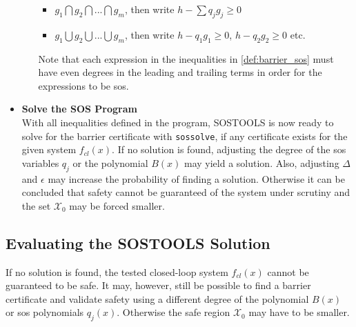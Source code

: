 \begin{itemize}
\begin{itemize}
		\begin{itemize}
			\item $g_1 \bigcap g_2 \bigcap ... \bigcap g_m$, then write $h - \sum q_jg_j\geq 0$
			\item $g_1 \bigcup g_2 \bigcup ... \bigcup g_m$, then write $h - q_1g_1\geq 0$, $h - q_2g_2\geq 0$ etc.
		\end{itemize} 
		Note that each expression in the inequalities in \autoref{def:barrier_sos} must have even degrees in the leading and trailing terms in order for the expressions to be \gls{sos}.
	\end{itemize}
	\item \textbf{Solve the SOS Program}\\
	With all inequalities defined in the program, SOSTOOLS is now ready to solve for the barrier certificate with \texttt{sossolve}, if any certificate exists for the given system $f_{cl}(x)$. If no solution is found, adjusting the degree of the \gls{sos} variables $q_j$ or the polynomial $B(x)$ may yield a solution. Also, adjusting $\Delta$ and $\epsilon$ may increase the probability of finding a solution. Otherwise it can be concluded that safety cannot be guaranteed of the system under scrutiny and the set $\mathcal{X}_0$ may be forced smaller. 
\end{itemize}









\subsection{Evaluating the SOSTOOLS Solution}\label{subsec:eval_sos}
If no solution is found, the tested closed-loop system $f_{cl}(x)$ cannot be guaranteed to be safe. It may, however, still be possible to find a barrier certificate and validate safety using a different degree of the polynomial $B(x)$ or \gls{sos} polynomials $q_j(x)$. Otherwise the safe region $\mathcal{X}_0$ may have to be smaller.

